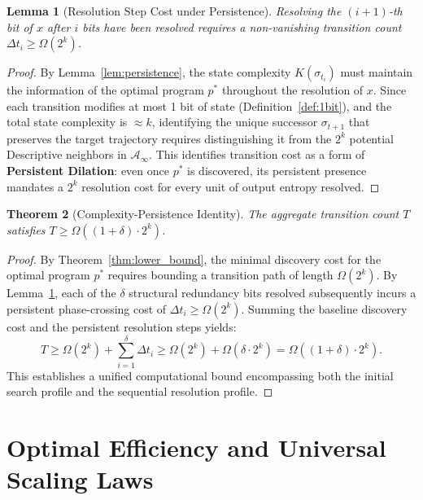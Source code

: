 \documentclass[12pt,a4paper]{article}
\theoremstyle{plain}
\newtheorem{theorem}{Theorem}[section]
\newtheorem{lemma}[theorem]{Lemma}
\theoremstyle{definition}
\begin{document}
\begin{lemma}[Resolution Step Cost under Persistence] \label{lem:persistence_cost}
Resolving the $(i+1)$-th bit of $x$ after $i$ bits have been resolved requires a 
non-vanishing transition count $\Delta t_i \ge \Omega(2^{k})$.
\end{lemma}
\begin{proof}
By Lemma~\ref{lem:persistence}, the state complexity $K(\sigma_{t_i})$ must maintain the 
information of the optimal program $p^*$ throughout the resolution of $x$. Since each 
transition modifies at most 1 bit of state (Definition~\ref{def:1bit}), and the total state 
complexity is $\approx k$, identifying the unique successor $\sigma_{t+1}$ that preserves 
the target trajectory requires distinguishing it from the $2^{k}$ potential Descriptive 
neighbors in $\mathcal{A}_\infty$. This identifies transition cost as a form of 
\textbf{Persistent Dilation}: even once $p^*$ is discovered, its persistent presence 
mandates a $2^k$ resolution cost for every unit of output entropy resolved.
\end{proof}

\begin{theorem}[Complexity-Persistence Identity] \label{thm:master}
The aggregate transition count $T$ satisfies $T \ge \Omega((1+\delta) \cdot 2^{k})$.
\end{theorem}
\begin{proof}
By Theorem~\ref{thm:lower_bound}, the minimal discovery cost for the optimal program 
$p^*$ requires bounding a transition path of length $\Omega(2^k)$. By 
Lemma~\ref{lem:persistence_cost}, each of the $\delta$ structural redundancy bits resolved 
subsequently incurs a persistent phase-crossing cost of $\Delta t_i \ge \Omega(2^k)$. 
Summing the baseline discovery cost and the persistent resolution steps yields:
\begin{equation}
    T \ge \Omega(2^k) + \sum_{i=1}^{\delta} \Delta t_i \ge \Omega(2^k) + \Omega(\delta \cdot 2^k) = \Omega((1+\delta) \cdot 2^k).
\end{equation}
This establishes a unified computational bound encompassing both the initial search profile 
and the sequential resolution profile.
\end{proof}

\section{Optimal Efficiency and Universal Scaling Laws} \label{sec:efficiency}
\end{document}
